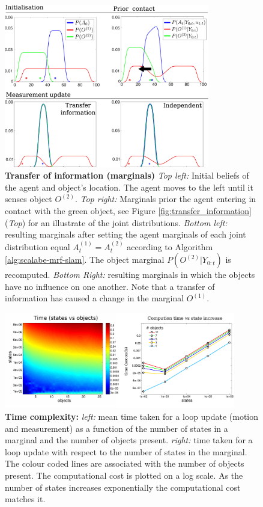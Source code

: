 \documentclass{frontiersSCNS} %
\begin{document}
\begin{figure}
  \centering
  \includegraphics[width=0.8\textwidth]{Figure10}
  \caption{\textbf{Transfer of information (marginals)} \textit{Top left:} Initial beliefs of the agent and object's location. The agent moves to the left until it senses object $O^{(2)}$.
  \textit{Top right:} Marginals prior the agent entering in contact with the green object, see Figure \ref{fig:transfer_information} (\textit{Top}) for an illustrate of the joint distributions.
  \textit{Bottom left:} resulting marginals after setting the agent marginals of each 
  joint distribution equal $A^{(1)}_t = A^{(2)}_t$ according to Algorithm \ref{alg:scalabe-mrf-slam}. The object marginal $P(O^{(2)}|Y_{0:t})$ is recomputed. 
  \textit{Bottom Right:} resulting marginals in which the objects have no influence on one another.
  Note that a transfer of information has caused a change in the marginal $O^{(1)}$.}
  \label{fig:independence_object}
\end{figure}

\begin{figure}
\centering
 \includegraphics[width=0.9\textwidth]{Figure11}
 \caption{\textbf{Time complexity:} \textit{left:} mean time taken for a loop update (motion and measurement) as a function of the number of states in a marginal and the 
 number of objects present. \textit{right:} time taken for a loop update with respect to the number of states in the marginal. The colour coded lines are 
 associated with the number of objects present. The computational cost is plotted on a log scale. As the number of states increases exponentially the
 computational cost matches it.}
 \label{fig:time_complexity}
\end{figure}
\end{document}

